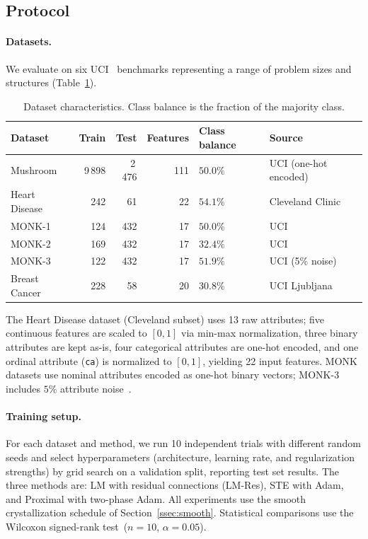 \documentclass[10pt,a4paper,twoside]{article}
\begin{document}
\subsection{Protocol}
\label{ssec:protocol}

\paragraph{Datasets.}
We evaluate on six UCI~\cite{uci2017} benchmarks representing a range of
problem sizes and structures (Table~\ref{tab:datasets}).

\begin{table}[h]
\centering
\caption{Dataset characteristics. Class balance is the fraction of the majority class.}
\label{tab:datasets}
\setlength{\tabcolsep}{5pt}
\begin{tabular}{lrrrll}
\toprule
Dataset & Train & Test & Features & Class balance & Source \\
\midrule
Mushroom       & 9\,898  & 2\,476 & 111 & $50.0\%$ & UCI (one-hot encoded) \\
Heart Disease  & 242     & 61     & 22  & $54.1\%$ & Cleveland Clinic~\cite{detrano1989} \\
MONK-1         & 124     & 432    & 17  & $50.0\%$ & UCI~\cite{thrun1991} \\
MONK-2         & 169     & 432    & 17  & $32.4\%$ & UCI~\cite{thrun1991} \\
MONK-3         & 122     & 432    & 17  & $51.9\%$ & UCI (5\% noise) \\
Breast Cancer  & 228     & 58     & 20  & $30.8\%$ & UCI Ljubljana \\
\bottomrule
\end{tabular}
\end{table}

The Heart Disease dataset (Cleveland subset) uses 13 raw attributes;
five continuous features are scaled to $[0,1]$ via min-max normalization,
three binary attributes are kept as-is, four categorical attributes are
one-hot encoded, and one ordinal attribute (\texttt{ca}) is normalized to
$[0,1]$, yielding 22 input features.
MONK datasets use nominal attributes encoded as one-hot binary vectors;
MONK-3 includes $5\%$ attribute noise~\cite{thrun1991}.

\paragraph{Training setup.}
For each dataset and method, we run 10 independent trials with different
random seeds and select hyperparameters (architecture, learning rate, and
regularization strengths) by grid search on a validation split, reporting
test set results.
The three methods are:
LM with residual connections (LM-Res), STE with Adam, and Proximal with
two-phase Adam.
All experiments use the smooth crystallization schedule of
Section~\ref{ssec:smooth}.
Statistical comparisons use the Wilcoxon signed-rank test~($n = 10$, $\alpha = 0.05$).
\end{document}
